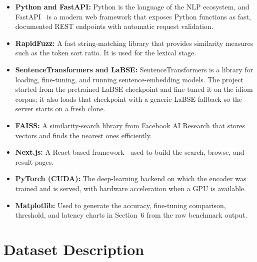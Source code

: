 \documentclass[12pt,a4paper]{article}
\let\oldsection\section
\renewcommand{\section}{\clearpage\oldsection}
\begin{document}
\begin{itemize}
  \item \textbf{Python and FastAPI:} Python is the language of the NLP ecosystem, and FastAPI~\cite{fastapi} is a modern web framework that exposes Python functions as fast, documented REST endpoints with automatic request validation.
  \item \textbf{RapidFuzz:} A fast string-matching library that provides similarity measures such as the token sort ratio. It is used for the lexical stage.
  \item \textbf{SentenceTransformers and LaBSE:} SentenceTransformers is a library for loading, fine-tuning, and running sentence-embedding models. The project started from the pretrained LaBSE checkpoint and fine-tuned it on the idiom corpus; it also loads that checkpoint with a generic-LaBSE fallback so the server starts on a fresh clone.
  \item \textbf{FAISS:} A similarity-search library from Facebook AI Research that stores vectors and finds the nearest ones efficiently.
  \item \textbf{Next.js:} A React-based framework~\cite{nextjs} used to build the search, browse, and result pages.
  \item \textbf{PyTorch (CUDA):} The deep-learning backend on which the encoder was trained and is served, with hardware acceleration when a GPU is available.
  \item \textbf{Matplotlib:} Used to generate the accuracy, fine-tuning comparison, threshold, and latency charts in Section~6 from the raw benchmark output.
\end{itemize}

\section{Dataset Description}
\end{document}
